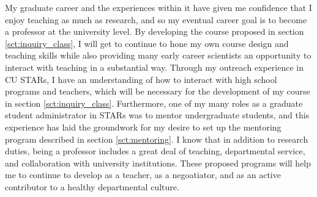 \documentclass[11pt, preprint]{aastex}
\begin{document}
My graduate career and the experiences within it have given me confidence that I enjoy teaching as much as research, and so my eventual career goal is to become a professor at the university level.
By developing the course proposed in section \ref{sct:inquiry_class}, I will get to continue to hone my own course design and teaching skills while also providing many early career scientists an opportunity to interact with teaching in a substantial way.
Through my outreach experience in CU STARs, I have an understanding of how to interact with high school programs and teachers, which will be necessary for the development of my course in section \ref{sct:inquiry_class}.
Furthermore, one of my many roles as a graduate student administrator in STARs was to mentor undergraduate students, and this experience has laid the groundwork for my desire to set up the mentoring program described in section \ref{sct:mentoring}.
I know that in addition to research duties, being a professor includes a great deal of teaching, departmental service, and collaboration with university institutions.
These proposed programs will help me to continue to develop as a teacher, as a negoatiator, and as an active contributor to a healthy departmental culture.
\end{document}
